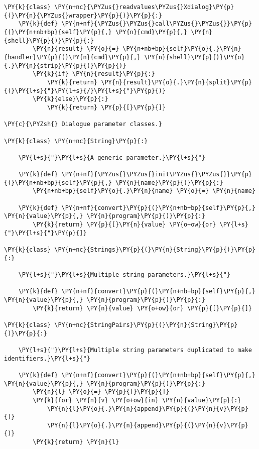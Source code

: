 \begin{Verbatim}[commandchars=\\\{\}]
\PY{k}{class} \PY{n+nc}{\PYZus{}readvalues\PYZus{}Xdialog}\PY{p}{(}\PY{n}{\PYZus{}wrapper}\PY{p}{)}\PY{p}{:}
    \PY{k}{def} \PY{n+nf}{\PYZus{}\PYZus{}call\PYZus{}\PYZus{}}\PY{p}{(}\PY{n+nb+bp}{self}\PY{p}{,} \PY{n}{cmd}\PY{p}{,} \PY{n}{shell}\PY{p}{)}\PY{p}{:}
        \PY{n}{result} \PY{o}{=} \PY{n+nb+bp}{self}\PY{o}{.}\PY{n}{handler}\PY{p}{(}\PY{n}{cmd}\PY{p}{,} \PY{n}{shell}\PY{p}{)}\PY{o}{.}\PY{n}{strip}\PY{p}{(}\PY{p}{)}
        \PY{k}{if} \PY{n}{result}\PY{p}{:}
            \PY{k}{return} \PY{n}{result}\PY{o}{.}\PY{n}{split}\PY{p}{(}\PY{l+s}{"}\PY{l+s}{/}\PY{l+s}{"}\PY{p}{)}
        \PY{k}{else}\PY{p}{:}
            \PY{k}{return} \PY{p}{[}\PY{p}{]}

\PY{c}{\PYZsh{} Dialogue parameter classes.}

\PY{k}{class} \PY{n+nc}{String}\PY{p}{:}

    \PY{l+s}{"}\PY{l+s}{A generic parameter.}\PY{l+s}{"}

    \PY{k}{def} \PY{n+nf}{\PYZus{}\PYZus{}init\PYZus{}\PYZus{}}\PY{p}{(}\PY{n+nb+bp}{self}\PY{p}{,} \PY{n}{name}\PY{p}{)}\PY{p}{:}
        \PY{n+nb+bp}{self}\PY{o}{.}\PY{n}{name} \PY{o}{=} \PY{n}{name}

    \PY{k}{def} \PY{n+nf}{convert}\PY{p}{(}\PY{n+nb+bp}{self}\PY{p}{,} \PY{n}{value}\PY{p}{,} \PY{n}{program}\PY{p}{)}\PY{p}{:}
        \PY{k}{return} \PY{p}{[}\PY{n}{value} \PY{o+ow}{or} \PY{l+s}{"}\PY{l+s}{"}\PY{p}{]}

\PY{k}{class} \PY{n+nc}{Strings}\PY{p}{(}\PY{n}{String}\PY{p}{)}\PY{p}{:}

    \PY{l+s}{"}\PY{l+s}{Multiple string parameters.}\PY{l+s}{"}

    \PY{k}{def} \PY{n+nf}{convert}\PY{p}{(}\PY{n+nb+bp}{self}\PY{p}{,} \PY{n}{value}\PY{p}{,} \PY{n}{program}\PY{p}{)}\PY{p}{:}
        \PY{k}{return} \PY{n}{value} \PY{o+ow}{or} \PY{p}{[}\PY{p}{]}

\PY{k}{class} \PY{n+nc}{StringPairs}\PY{p}{(}\PY{n}{String}\PY{p}{)}\PY{p}{:}

    \PY{l+s}{"}\PY{l+s}{Multiple string parameters duplicated to make identifiers.}\PY{l+s}{"}

    \PY{k}{def} \PY{n+nf}{convert}\PY{p}{(}\PY{n+nb+bp}{self}\PY{p}{,} \PY{n}{value}\PY{p}{,} \PY{n}{program}\PY{p}{)}\PY{p}{:}
        \PY{n}{l} \PY{o}{=} \PY{p}{[}\PY{p}{]}
        \PY{k}{for} \PY{n}{v} \PY{o+ow}{in} \PY{n}{value}\PY{p}{:}
            \PY{n}{l}\PY{o}{.}\PY{n}{append}\PY{p}{(}\PY{n}{v}\PY{p}{)}
            \PY{n}{l}\PY{o}{.}\PY{n}{append}\PY{p}{(}\PY{n}{v}\PY{p}{)}
        \PY{k}{return} \PY{n}{l}


\end{Verbatim}
